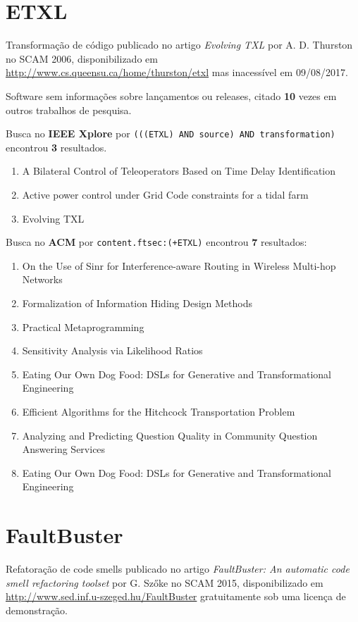 \section{ETXL}

Transformação de código
publicado no artigo {\it Evolving TXL}
por A. D. Thurston
no SCAM 2006,
disponibilizado em \url{http://www.cs.queensu.ca/home/thurston/etxl}
mas inacessível em 09/08/2017.

Software sem informações sobre lançamentos ou releases,
citado {\bf 10} vezes em outros trabalhos de pesquisa.

Busca no {\bf IEEE Xplore} por
\texttt{(((ETXL) AND source) AND transformation)}
encontrou {\bf 3}
resultados.

\begin{enumerate}
\item A Bilateral Control of Teleoperators Based on Time Delay Identification
\item Active power control under Grid Code constraints for a tidal farm
\item Evolving TXL
\end{enumerate}

Busca no {\bf ACM} por
\texttt{content.ftsec:(+ETXL)}
encontrou {\bf 7}
resultados:

\begin{enumerate}
\item On the Use of Sinr for Interference-aware Routing in Wireless Multi-hop Networks
\item Formalization of Information Hiding Design Methods
\item Practical Metaprogramming
\item Sensitivity Analysis via Likelihood Ratios
\item Eating Our Own Dog Food: DSLs for Generative and Transformational Engineering
\item Efficient Algorithms for the Hitchcock Transportation Problem
\item Analyzing and Predicting Question Quality in Community Question Answering Services
\item Eating Our Own Dog Food: DSLs for Generative and Transformational Engineering
\end{enumerate}

\section{FaultBuster}

Refatoração de code smells
publicado no artigo {\it FaultBuster: An automatic code smell refactoring toolset}
por G. Szőke
no SCAM 2015,
disponibilizado em \url{http://www.sed.inf.u-szeged.hu/FaultBuster}
gratuitamente
sob uma licença de demonstração.

